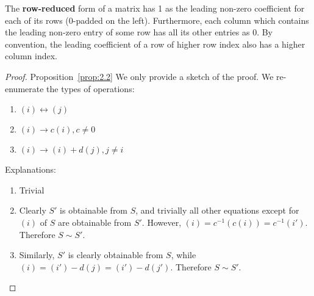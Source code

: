 \begin{definition} 
    The \textbf{row-reduced} form of a matrix has 1 as the leading non-zero coefficient for each of its rows (0-padded on the left). Furthermore, each column which contains the leading non-zero entry of some row has all its other entries as 0. By convention, the leading coefficient of a row of higher row index also has a higher column index.
\end{definition}

\begin{proof}{Proposition~\ref{prop:2.2}}
    We only provide a sketch of the proof. We re-enumerate the types of operations:
    \begin{enumerate}
        \item \((i) \leftrightarrow (j)\)
        \item \((i) \rightarrow c(i), c \neq 0\)
        \item \((i) \rightarrow (i) + d(j), j \neq i\)
    \end{enumerate}
    Explanations:
    \begin{enumerate}
        \item Trivial
        \item Clearly \(S'\) is obtainable from \(S\), and trivially all other equations except for \((i)\) of \(S\) are obtainable from \(S'\). However, \((i) = c^{-1}(c(i)) = c^{-1}(i')\). Therefore \(S \sim S'\).
        \item Similarly, \(S'\) is clearly obtainable from \(S\), while \((i) = (i') - d(j) = (i') - d(j')\). Therefore \(S \sim S'\).
    \end{enumerate}
\end{proof}

